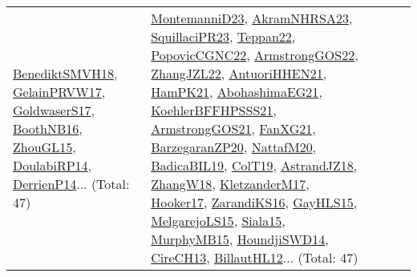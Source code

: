 {\begin{longtable}{lp{3cm}>{\raggedright}p{6cm}>{\raggedright}p{6cm}p{8cm}}
\href{papers/BenediktSMVH18.pdf}{BenediktSMVH18}\cite{BenediktSMVH18}, \href{papers/GelainPRVW17.pdf}{GelainPRVW17}\cite{GelainPRVW17}, \href{papers/GoldwaserS17.pdf}{GoldwaserS17}\cite{GoldwaserS17}, \href{papers/BoothNB16.pdf}{BoothNB16}\cite{BoothNB16}, \href{papers/ZhouGL15.pdf}{ZhouGL15}\cite{ZhouGL15}, \href{papers/DoulabiRP14.pdf}{DoulabiRP14}\cite{DoulabiRP14}, \href{papers/DerrienP14.pdf}{DerrienP14}\cite{DerrienP14}... (Total: 47) & \href{articles/MontemanniD23.pdf}{MontemanniD23}\cite{MontemanniD23}, \href{articles/AkramNHRSA23.pdf}{AkramNHRSA23}\cite{AkramNHRSA23}, \href{papers/SquillaciPR23.pdf}{SquillaciPR23}\cite{SquillaciPR23}, \href{papers/Teppan22.pdf}{Teppan22}\cite{Teppan22}, \href{papers/PopovicCGNC22.pdf}{PopovicCGNC22}\cite{PopovicCGNC22}, \href{papers/ArmstrongGOS22.pdf}{ArmstrongGOS22}\cite{ArmstrongGOS22}, \href{papers/ZhangJZL22.pdf}{ZhangJZL22}\cite{ZhangJZL22}, \href{papers/AntuoriHHEN21.pdf}{AntuoriHHEN21}\cite{AntuoriHHEN21}, \href{articles/HamPK21.pdf}{HamPK21}\cite{HamPK21}, \href{articles/AbohashimaEG21.pdf}{AbohashimaEG21}\cite{AbohashimaEG21}, \href{articles/KoehlerBFFHPSSS21.pdf}{KoehlerBFFHPSSS21}\cite{KoehlerBFFHPSSS21}, \href{papers/ArmstrongGOS21.pdf}{ArmstrongGOS21}\cite{ArmstrongGOS21}, \href{articles/FanXG21.pdf}{FanXG21}\cite{FanXG21}, \href{papers/BarzegaranZP20.pdf}{BarzegaranZP20}\cite{BarzegaranZP20}, \href{papers/NattafM20.pdf}{NattafM20}\cite{NattafM20}, \href{papers/BadicaBIL19.pdf}{BadicaBIL19}\cite{BadicaBIL19}, \href{papers/ColT19.pdf}{ColT19}\cite{ColT19}, \href{papers/AstrandJZ18.pdf}{AstrandJZ18}\cite{AstrandJZ18}, \href{articles/ZhangW18.pdf}{ZhangW18}\cite{ZhangW18}, \href{papers/KletzanderM17.pdf}{KletzanderM17}\cite{KletzanderM17}, \href{papers/Hooker17.pdf}{Hooker17}\cite{Hooker17}, \href{articles/ZarandiKS16.pdf}{ZarandiKS16}\cite{ZarandiKS16}, \href{papers/GayHLS15.pdf}{GayHLS15}\cite{GayHLS15}, \href{papers/MelgarejoLS15.pdf}{MelgarejoLS15}\cite{MelgarejoLS15}, \href{articles/Siala15.pdf}{Siala15}\cite{Siala15}, \href{papers/MurphyMB15.pdf}{MurphyMB15}\cite{MurphyMB15}, \href{papers/HoundjiSWD14.pdf}{HoundjiSWD14}\cite{HoundjiSWD14}, \href{papers/CireCH13.pdf}{CireCH13}\cite{CireCH13}, \href{papers/BillautHL12.pdf}{BillautHL12}\cite{BillautHL12}... (Total: 47)\\

\end{longtable}}
